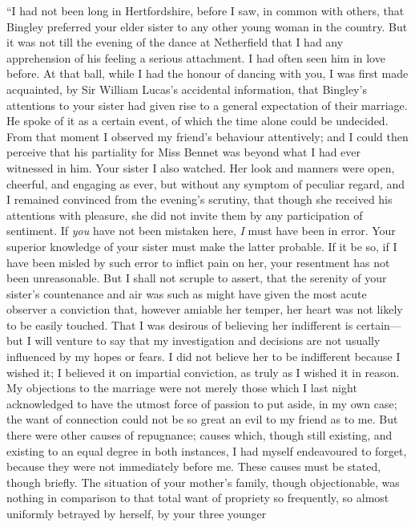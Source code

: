 ``I had not been long in Hertfordshire, before I saw, in common
with others, that Bingley preferred your elder sister to any other
young woman in the country.  But it was not till the evening of
the dance at Netherfield that I had any apprehension of his
feeling a serious attachment.  I had often seen him in love before.
At that ball, while I had the honour of dancing with you, I was
first made acquainted, by Sir William Lucas's accidental
information, that Bingley's attentions to your sister had given
rise to a general expectation of their marriage.  He spoke of it
as a certain event, of which the time alone could be undecided.
From that moment I observed my friend's behaviour attentively;
and I could then perceive that his partiality for Miss Bennet
was beyond what I had ever witnessed in him.  Your sister I
also watched.  Her look and manners were open, cheerful, and
engaging as ever, but without any symptom of peculiar regard,
and I remained convinced from the evening's scrutiny, that
though she received his attentions with pleasure, she did not
invite them by any participation of sentiment.  If \emph{you} have not
been mistaken here, \emph{I} must have been in error.  Your superior
knowledge of your sister must make the latter probable.  If it be
so, if I have been misled by such error to inflict pain on her,
your resentment has not been unreasonable.  But I shall not scruple
to assert, that the serenity of your sister's countenance and air
was such as might have given the most acute observer a conviction
that, however amiable her temper, her heart was not likely to be
easily touched.  That I was desirous of believing her indifferent
is certain---but I will venture to say that my investigation and
decisions are not usually influenced by my hopes or fears.  I did
not believe her to be indifferent because I wished it; I believed
it on impartial conviction, as truly as I wished it in reason.
My objections to the marriage were not merely those which I last
night acknowledged to have the utmost force of passion to put
aside, in my own case; the want of connection could not be so
great an evil to my friend as to me.  But there were other causes
of repugnance; causes which, though still existing, and existing
to an equal degree in both instances, I had myself endeavoured
to forget, because they were not immediately before me.  These
causes must be stated, though briefly.  The situation of
your mother's family, though objectionable, was nothing in
comparison to that total want of propriety so frequently, so
almost uniformly betrayed by herself, by your three younger
